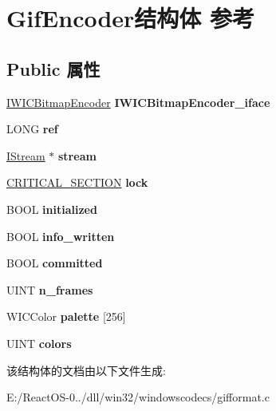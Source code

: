 \hypertarget{struct_gif_encoder}{}\section{Gif\+Encoder结构体 参考}
\label{struct_gif_encoder}
\subsection*{Public 属性}
\begin{DoxyCompactItemize}
\item 
\mbox{\label{struct_gif_encoder_a0dd84d6b1639308e2f568130fcf3cbb9}} 
\hyperlink{interface_i_w_i_c_bitmap_encoder}{I\+W\+I\+C\+Bitmap\+Encoder} {\bfseries I\+W\+I\+C\+Bitmap\+Encoder\+\_\+iface}
\item 
\mbox{\label{struct_gif_encoder_a28d409089a1e1e0496cfa3d52e0b3f30}} 
L\+O\+NG {\bfseries ref}
\item 
\mbox{\label{struct_gif_encoder_ac40eac7b3978a44768a63d85a6d3280e}} 
\hyperlink{interface_i_stream}{I\+Stream} $\ast$ {\bfseries stream}
\item 
\mbox{\label{struct_gif_encoder_a194164bfe2f2c81771897be773353c8a}} 
\hyperlink{struct___c_r_i_t_i_c_a_l___s_e_c_t_i_o_n}{C\+R\+I\+T\+I\+C\+A\+L\+\_\+\+S\+E\+C\+T\+I\+ON} {\bfseries lock}
\item 
\mbox{\label{struct_gif_encoder_ab3811603dd685ec242a310b9079d6401}} 
B\+O\+OL {\bfseries initialized}
\item 
\mbox{\label{struct_gif_encoder_adfd2aa1422fe39e0c736c2c0565b7dd1}} 
B\+O\+OL {\bfseries info\+\_\+written}
\item 
\mbox{\label{struct_gif_encoder_a7c15031b51198d0d766ff7a3879d063b}} 
B\+O\+OL {\bfseries committed}
\item 
\mbox{\label{struct_gif_encoder_a8d11a8c12eb7520140cd3bd21bf79cd7}} 
U\+I\+NT {\bfseries n\+\_\+frames}
\item 
\mbox{\label{struct_gif_encoder_ab124e30dde9c5d51b0d65b4f68953a4f}} 
W\+I\+C\+Color {\bfseries palette} \mbox{[}256\mbox{]}
\item 
\mbox{\label{struct_gif_encoder_aa595907cd624aee1b8081af8f9a40ca3}} 
U\+I\+NT {\bfseries colors}
\end{DoxyCompactItemize}


该结构体的文档由以下文件生成\+:\begin{DoxyCompactItemize}
\item 
E\+:/\+React\+O\+S-\/0../dll/win32/windowscodecs/gifformat.\+c\end{DoxyCompactItemize}
